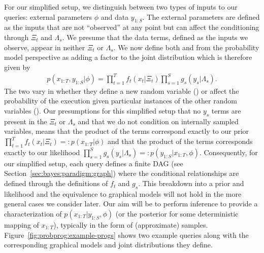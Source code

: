 For our simplified setup, we distinguish between two types of inputs to our queries: external 
parameters $\phi$ and data $y_{1:S}$.
The external parameters are defined as the inputs that are 
not ``observed'' at any point but can affect the conditioning through $\Xi_t$ and $\Lambda_s$.
We presume that the data terms, defined as the inputs we observe, 
appear in neither $\Xi_t$ or $\Lambda_s$.
We now define both \sample and \observe from the probability model perspective
as adding a factor to the joint distribution which is therefore given by
\begin{align}
\label{eq:probprog:simple-joint}
p(x_{1:T},y_{1:S} | \phi) = \prod_{t=1}^{T} f_t(x_t | \Xi_t) \prod_{s=1}^{S} g_s(y_s|\Lambda_s).
\end{align}
The two vary in whether they define a new random variable (\sample) or affect the probability of the
execution given particular instances of the other random variables (\observe).
Our presumptions for this simplified setup that no $y_{s}$ terms are present in the $\Xi_t$ or $\Lambda_s$
and that we do not condition on internally sampled variables, means that the product of the \sample terms
correspond exactly to our prior $\prod_{t=1}^{T} f_t(x_t | \Xi_t) =: p(x_{1:T} | \phi)$ and that the
product of the \observe terms corresponds exactly to our likelihood
$\prod_{s=1}^{S} g_s(y_s|\Lambda_s) =: p(y_{1:S} | x_{1:T}, \phi)$.  Consequently, for our simplified setup,
each query defines a finite DAG (see Section~\ref{sec:bayes:paradigm:graph})
where the conditional relationships are defined through the definitions of $f_t$ and $g_s$.
This breakdown into a prior and likelihood and the equivalence to graphical models
will not hold in the more general cases we consider later.  Our aim will be to perform inference
to provide a characterization of $p(x_{1:T} | y_{1:S}, \phi)$ (or the posterior for some deterministic
mapping of $x_{1:T}$), typically in the form of (approximate)
samples.  Figure~\ref{fig:probprog:example-progs} shows two example queries
along with the corresponding graphical models and joint distributions they define.

